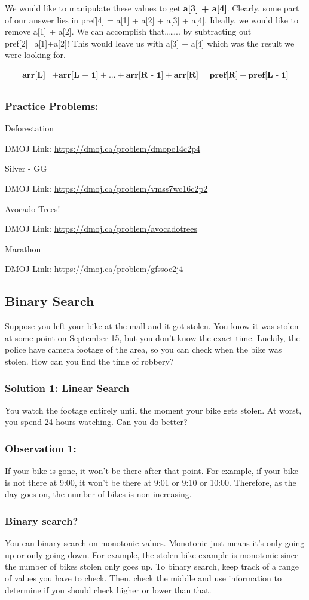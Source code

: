 \documentclass{report}
\newcommand{\problem}[2]{
    \begin{problembox}
        #1
        
        DMOJ Link: \href{#2}{#2}
    \end{problembox}
}
\begin{document}
We would like to manipulate these values to get \textbf{a[3] + a[4]}. Clearly, some part of our answer lies in pref[4] = a[1] + a[2] + a[3] + a[4]. Ideally, we would like to remove a[1] + a[2]. We can accomplish that…….. by subtracting out pref[2]=a[1]+a[2]! This would leave us with a[3] + a[4] which was the result we were looking for.

\begin{align*}
    \textbf{arr[L]} &+ \textbf{arr[L + 1]} + ... + \textbf{arr[R - 1]} + \textbf{arr[R]} = \textbf{pref[R]} - \textbf{pref[L - 1]} \\
\end{align*}

\subsubsection{Practice Problems: }
\problem{Deforestation}{https://dmoj.ca/problem/dmopc14c2p4}
\problem{Silver - GG}{https://dmoj.ca/problem/vmss7wc16c2p2}
\problem{Avocado Trees!}{https://dmoj.ca/problem/avocadotrees}
\problem{Marathon}{https://dmoj.ca/problem/gfssoc2j4}

\subsection{Binary Search}
Suppose you left your bike at the mall and it got stolen. You know it was stolen at some point on September 15, but you don’t know the exact time. Luckily, the police have camera footage of the area, so you can check when the bike was stolen. How can you find the time of robbery?

\subsubsection*{Solution 1: Linear Search}
You watch the footage entirely until the moment your bike gets stolen. At worst, you spend 24 hours watching. Can you do better?
\subsubsection*{Observation 1: }
If your bike is gone, it won’t be there after that point. For example, if your bike is not there at 9:00, it won’t be there at 9:01 or 9:10 or 10:00. Therefore, as the day goes on, the number of bikes is non-increasing.

\subsubsection*{Binary search?}
You can binary search on monotonic values. Monotonic just means it’s only going up or only going down. For example, the stolen bike example is monotonic since the number of bikes stolen only goes up. To binary search, keep track of a range of values you have to check. Then, check the middle and use information to determine if you should check higher or lower than that.\newline
\end{document}

